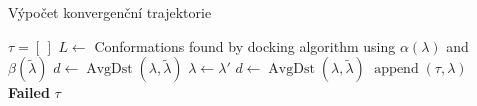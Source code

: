 \begin{algorithm}
\caption{Výpočet konvergenční trajektorie}
\label{alg:convergence}
\begin{algorithmic}[1]

    \State $ \tau = [\,] $
    \While {$\lambda \not\in \Delta\tilde{\lambda}$}
        \State $ L \gets $ Conformations found by docking algorithm using $ \alpha(\lambda) $
            and $ \beta(\tilde{\lambda})$ \label{alg:convergence:docking}
        \State $ d \gets \operatorname{AvgDst}(\lambda, \tilde{\lambda}) $
             \label{alg:convergence:feasibility}
                 \label{alg:convergence:best}
                    \State $ \lambda \gets \lambda' $
                \EndIf
            \EndIf
        \EndFor
         \label{alg:convergence:progress}
            \State $d \gets \operatorname{AvgDst}(\lambda, \tilde{\lambda}) $
            \State $ \operatorname{append}(\tau, \lambda) $
        \Else
            \State \Return \textbf{Failed}
        \EndIf
    \EndWhile
    \State \Return $\tau$
\EndFunction


\end{algorithmic}
\end{algorithm}
